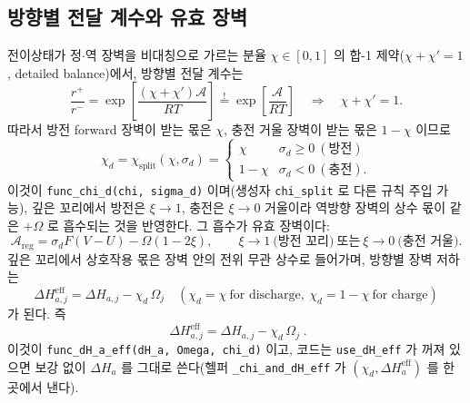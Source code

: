 \documentclass[11pt,a4paper]{article}
\newcommand{\eff}{\mathrm{eff}}
\newcommand{\code}[1]{\texttt{#1}}
\begin{document}
\subsection{방향별 전달 계수와 유효 장벽}
전이상태가 정$\cdot$역 장벽을 비대칭으로 가르는 분율 $\chi\in[0,1]$ 의 합-1 제약($\chi+\chi'=1$, detailed balance)에서,
방향별 전달 계수는
\begin{equation}
\frac{r^+}{r^-}
=\exp\!\left[\frac{(\chi+\chi')\mathcal A}{RT}\right]
\overset{!}{=}\exp\!\left[\frac{\mathcal A}{RT}\right]
\quad\Longrightarrow\quad \chi+\chi'=1.
\label{eq:chidderive}
\end{equation}
따라서 방전 forward 장벽이 받는 몫은 $\chi$, 충전 거울 장벽이 받는 몫은 $1-\chi$ 이므로
\begin{equation}
\chi_d=\chi_\mathrm{split}(\chi,\sigma_d)=
\begin{cases}\chi & \sigma_d\ge0\ (\text{방전})\\ 1-\chi & \sigma_d<0\ (\text{충전}).\end{cases}
\label{eq:chid}
\end{equation}
이것이 \code{func\_chi\_d(chi, sigma\_d)} 이며(생성자 \code{chi\_split} 로 다른 규칙 주입 가능), 깊은 꼬리에서 방전은
$\xi\to1$, 충전은 $\xi\to0$ 거울이라 역방향 장벽의 상수 몫이 같은 $+\Omega$ 로 흡수되는 것을 반영한다. 그 흡수가 유효
장벽이다:
\begin{equation}
\mathcal A_{\mathrm{reg}}=\sigma_dF(V-U)-\Omega(1-2\xi),
\qquad
\xi\to1\ \text{(방전 꼬리)}\ \text{또는}\ \xi\to0\ \text{(충전 거울)}.
\label{eq:dHeffderiveA}
\end{equation}
깊은 꼬리에서 상호작용 몫은 장벽 안의 전위 무관 상수로 들어가며, 방향별 장벽 저하는
\begin{equation}
\Delta H_{a,j}^{\eff}
=\Delta H_{a,j}-\chi_d\,\Omega_j
\quad
(\chi_d=\chi\ \text{for discharge},\ \chi_d=1-\chi\ \text{for charge})
\label{eq:dHeffderiveB}
\end{equation}
가 된다. 즉
\begin{equation}
\boxed{\;\Delta H_{a,j}^\eff=\Delta H_{a,j}-\chi_d\,\Omega_j\;.}
\label{eq:dHeff}
\end{equation}
이것이 \code{func\_dH\_a\_eff(dH\_a, Omega, chi\_d)} 이고, 코드는 \code{use\_dH\_eff} 가 꺼져 있으면 보강 없이
$\Delta H_a$ 를 그대로 쓴다(헬퍼 \code{\_chi\_and\_dH\_eff} 가 $(\chi_d,\Delta H_a^\eff)$ 를 한 곳에서 낸다).
\end{document}
